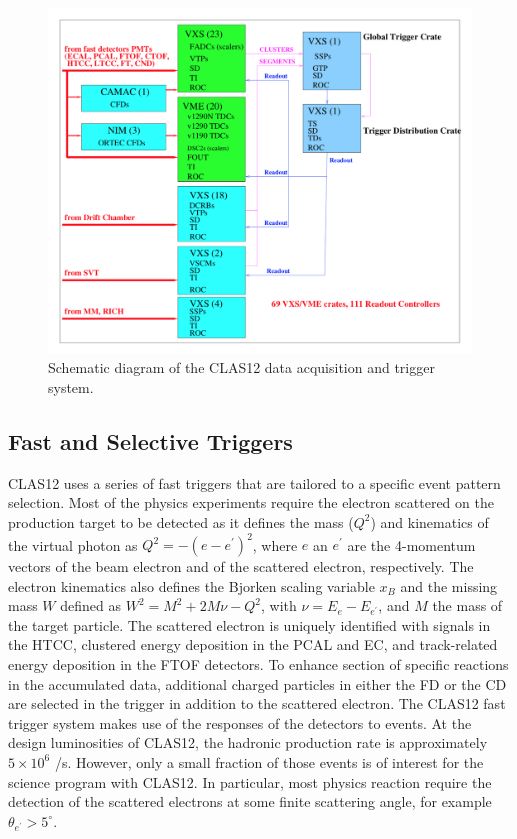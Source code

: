 \documentclass[final,3p,times,twocolumn,authoryear]{elsarticle}
\begin{document}
\begin{figure}[htbp!]
\centerline{\includegraphics[width=1.0\columnwidth]{clas12-daq.png}}
\caption{Schematic diagram of the CLAS12 data acquisition and trigger system.}
\label{daq}
\end{figure}


\subsection{\rm Fast and Selective Triggers} 

CLAS12 uses a series of fast triggers that are tailored to a specific event pattern selection. Most of 
the physics experiments require the electron scattered on the production target to be detected as it defines
the mass ($Q^2$) and kinematics of the virtual photon as $Q^2 = -(e - e^\prime)^2$, where $e$ an $e^\prime$ are 
the 4-momentum vectors of the beam electron and of the scattered electron, respectively. The electron kinematics 
also defines the Bjorken scaling variable $x_B$  and the missing mass $W$ defined as $W^2 = M^2 + 2M\nu - Q^2$,
with $\nu = E_e - E_{e^\prime}$, and $M$ the mass of the target particle. The scattered electron is uniquely identified
with signals in the HTCC, clustered energy deposition  in the PCAL and EC, and track-related energy deposition 
in the FTOF detectors.   
To enhance section of specific reactions in the accumulated data, additional charged particles in either the FD or 
the CD are selected in the trigger in addition to the 
scattered electron. The CLAS12 fast trigger system makes use of the responses of the detectors to events. 
At the design luminosities of 
CLAS12, the hadronic production rate is approximately $5 \times 10^6$ /s. 
However, only a small fraction of those events is of interest for the science program with CLAS12. In particular, most 
physics reaction require the detection of the scattered electrons at some finite scattering angle, for example 
$\theta_{e^\prime} > 5^\circ$.  
   
\end{document}
